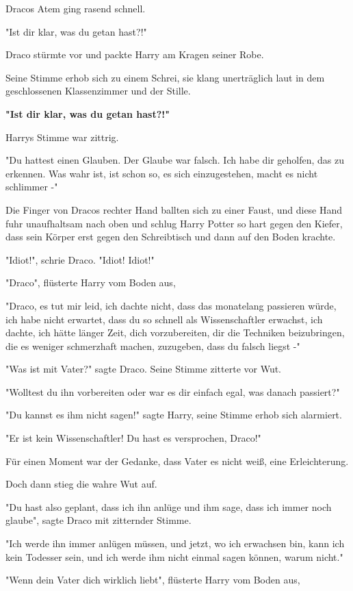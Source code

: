 {Dracos Atem ging rasend schnell.

"Ist dir klar, was du getan hast?!"

Draco stürmte vor und packte Harry am Kragen seiner Robe.

Seine Stimme erhob sich zu einem Schrei, sie klang unerträglich laut in dem geschlossenen Klassenzimmer und der Stille.

\textbf{"Ist dir klar, was du getan hast?!"}

Harrys Stimme war zittrig.

"Du hattest einen Glauben. Der Glaube war falsch. Ich habe dir geholfen, das zu erkennen. Was wahr ist, ist schon so, es sich einzugestehen, macht es nicht schlimmer -"

Die Finger von Dracos rechter Hand ballten sich zu einer Faust, und diese Hand fuhr unaufhaltsam nach oben und schlug Harry Potter so hart gegen den Kiefer, dass sein Körper erst gegen den Schreibtisch und dann auf den Boden krachte.

"Idiot!", schrie Draco. "Idiot! Idiot!"

"Draco", flüsterte Harry vom Boden aus,

"Draco, es tut mir leid, ich dachte nicht, dass das monatelang passieren würde, ich habe nicht erwartet, dass du so schnell als Wissenschaftler erwachst, ich dachte, ich hätte länger Zeit, dich vorzubereiten, dir die Techniken beizubringen, die es weniger schmerzhaft machen, zuzugeben, dass du falsch liegst -"

"Was ist mit Vater?" sagte Draco. Seine Stimme zitterte vor Wut.

"Wolltest du ihn vorbereiten oder war es dir einfach egal, was danach passiert?"

"Du kannst es ihm nicht sagen!" sagte Harry, seine Stimme erhob sich alarmiert.

"Er ist kein Wissenschaftler! Du hast es versprochen, Draco!"

Für einen Moment war der Gedanke, dass Vater es nicht weiß, eine Erleichterung.

Doch dann stieg die wahre Wut auf.

"Du hast also geplant, dass ich ihn anlüge und ihm sage, dass ich immer noch glaube", sagte Draco mit zitternder Stimme.

"Ich werde ihn immer anlügen müssen, und jetzt, wo ich erwachsen bin, kann ich kein Todesser sein, und ich werde ihm nicht einmal sagen können, warum nicht."

"Wenn dein Vater dich wirklich liebt", flüsterte Harry vom Boden aus,

}
